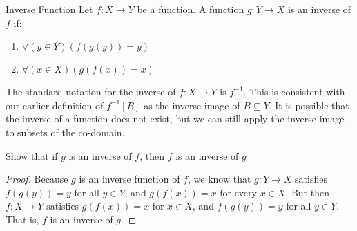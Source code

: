 \documentclass[letterpaper,12pt]{report}
\begin{document}
\begin{dfnbox}{Inverse Function}{}
	Let $f : X \to Y$ be a function. A function $g : Y \to X$ is an inverse of $f$ if:
	\begin{enumerate}
		\item $\forall (y \in Y) (f(g(y)) = y)$
		\item $\forall (x \in X) (g(f(x)) = x)$
	\end{enumerate}
\end{dfnbox}

The standard notation for the inverse of $f : X \to Y$ is $f^{-1}$. This is consistent with our earlier definition of $f^{-1}[B]$ as the inverse image of $B \subseteq Y$. It is possible that the inverse of a function does not exist, but we can still apply the inverse image to subsets of the co-domain.

\begin{exbox}{}{}
	Show that if $g$ is an inverse of $f$, then $f$ is an inverse of $g$
	\tcblower
	\begin{proof}
		Because $g$ is an inverse function of $f$, we know that $g : Y \to X$ satisfies $f(g(y)) = y$ for all $y \in Y$, and $g(f(x)) = x$ for every $x \in X$. But then $f : X \to Y$ satisfies $g(f(x)) = x$ for $x \in X$, and $f(g(y)) = y$ for all $y \in Y$. That is, $f$ is an inverse of $g$.
	\end{proof}
\end{exbox}
\end{document}
